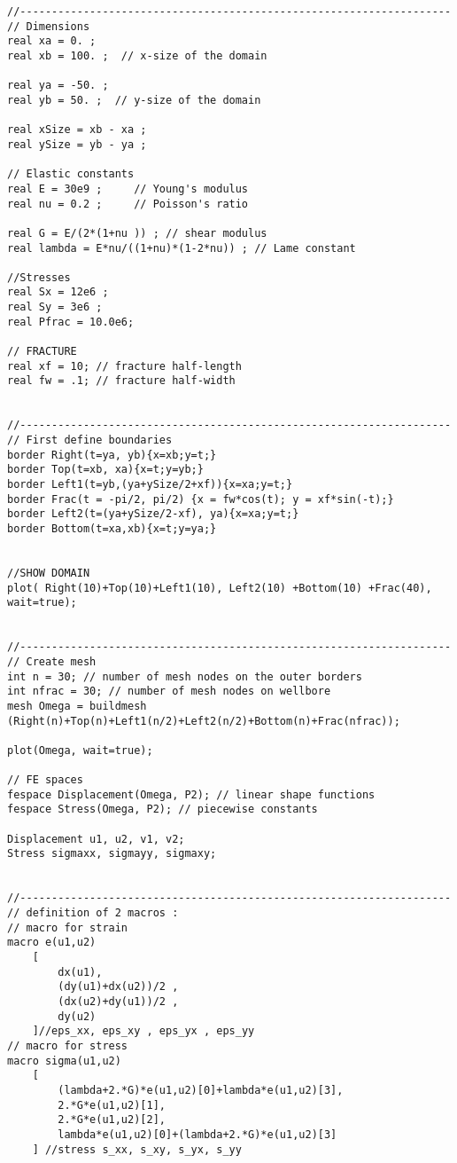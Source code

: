 \documentclass[8pt]{extarticle}
\begin{document}
\begin{verbatim}
//--------------------------------------------------------------------
// Dimensions
real xa = 0. ;
real xb = 100. ;  // x-size of the domain

real ya = -50. ;
real yb = 50. ;  // y-size of the domain

real xSize = xb - xa ;
real ySize = yb - ya ;

// Elastic constants
real E = 30e9 ;     // Young's modulus
real nu = 0.2 ;     // Poisson's ratio

real G = E/(2*(1+nu )) ; // shear modulus
real lambda = E*nu/((1+nu)*(1-2*nu)) ; // Lame constant

//Stresses
real Sx = 12e6 ;
real Sy = 3e6 ;
real Pfrac = 10.0e6;

// FRACTURE
real xf = 10; // fracture half-length
real fw = .1; // fracture half-width


//--------------------------------------------------------------------
// First define boundaries 
border Right(t=ya, yb){x=xb;y=t;}
border Top(t=xb, xa){x=t;y=yb;}
border Left1(t=yb,(ya+ySize/2+xf)){x=xa;y=t;}
border Frac(t = -pi/2, pi/2) {x = fw*cos(t); y = xf*sin(-t);}
border Left2(t=(ya+ySize/2-xf), ya){x=xa;y=t;}
border Bottom(t=xa,xb){x=t;y=ya;} 


//SHOW DOMAIN
plot( Right(10)+Top(10)+Left1(10), Left2(10) +Bottom(10) +Frac(40), wait=true);


//--------------------------------------------------------------------
// Create mesh 
int n = 30; // number of mesh nodes on the outer borders 
int nfrac = 30; // number of mesh nodes on wellbore 
mesh Omega = buildmesh (Right(n)+Top(n)+Left1(n/2)+Left2(n/2)+Bottom(n)+Frac(nfrac));

plot(Omega, wait=true);

// FE spaces 
fespace Displacement(Omega, P2); // linear shape functions 
fespace Stress(Omega, P2); // piecewise constants

Displacement u1, u2, v1, v2;
Stress sigmaxx, sigmayy, sigmaxy;


//--------------------------------------------------------------------
// definition of 2 macros : 
// macro for strain 
macro e(u1,u2)
    [
        dx(u1),
        (dy(u1)+dx(u2))/2 ,
        (dx(u2)+dy(u1))/2 , 
        dy(u2)
    ]//eps_xx, eps_xy , eps_yx , eps_yy
// macro for stress 
macro sigma(u1,u2)
    [
        (lambda+2.*G)*e(u1,u2)[0]+lambda*e(u1,u2)[3],
        2.*G*e(u1,u2)[1],
        2.*G*e(u1,u2)[2],
        lambda*e(u1,u2)[0]+(lambda+2.*G)*e(u1,u2)[3]
    ] //stress s_xx, s_xy, s_yx, s_yy


\end{verbatim}
\end{document}
